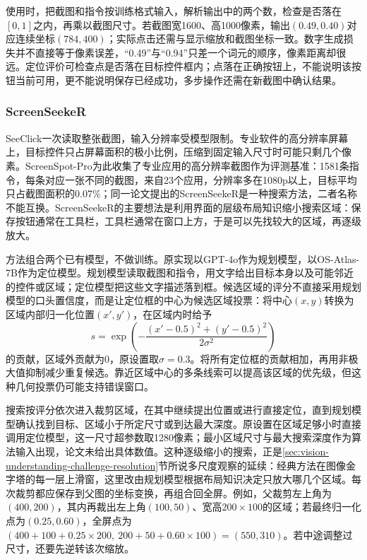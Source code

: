 使用时，把截图和指令按训练格式输入，解析输出中的两个数，检查是否落在$[0,1]$之内，再乘以截图尺寸。若截图宽1600、高1000像素，输出$(0.49,0.40)$对应连续坐标$(784,400)$；实际点击还需与显示缩放和截图坐标一致。数字生成损失并不直接等于像素误差，“0.49”与“0.94”只差一个词元的顺序，像素距离却很远。定位评价可检查点是否落在目标控件框内；点落在正确按钮上，不能说明该按钮当前可用，更不能说明保存已经成功，多步操作还需在新截图中确认结果。

\subsubsection{ScreenSeekeR}
\label{sec:vision-understanding-screenseeker}

SeeClick一次读取整张截图，输入分辨率受模型限制。专业软件的高分辨率屏幕上，目标控件只占屏幕面积的极小比例，压缩到固定输入尺寸时可能只剩几个像素。ScreenSpot-Pro为此收集了专业应用的高分辨率截图作为评测基准：1581条指令，每条对应一张不同的截图，来自23个应用，分辨率多在1080p以上，目标平均只占截图面积的0.07\%；同一论文提出的ScreenSeekeR是一种搜索方法，二者名称不能互换。ScreenSeekeR的主要想法是利用界面的层级布局知识缩小搜索区域：保存按钮通常在工具栏，工具栏通常在窗口上方，于是可以先找较大的区域，再逐级放大。

方法组合两个已有模型，不做训练。原实现以GPT-4o作为规划模型，以OS-Atlas-7B作为定位模型。规划模型读取截图和指令，用文字给出目标本身以及可能邻近的控件或区域；定位模型把这些文字描述落到框。候选区域的评分不直接采用规划模型的口头置信度，而是让定位框的中心为候选区域投票：将中心$(x,y)$转换为区域内部归一化位置$(x',y')$，在区域内时给予
\begin{equation}
  s=\exp\!\left(-\frac{(x'-0.5)^2+(y'-0.5)^2}{2\sigma^2}\right)
  \label{eq:vision-screenseeker-vote}
\end{equation}
的贡献，区域外贡献为0，原设置取$\sigma=0.3$。将所有定位框的贡献相加，再用非极大值抑制减少重复候选。靠近区域中心的多条线索可以提高该区域的优先级，但这种几何投票仍可能支持错误窗口。

搜索按评分依次进入裁剪区域，在其中继续提出位置或进行直接定位，直到规划模型确认找到目标、区域小于所定尺寸或到达最大深度。原设置在区域足够小时直接调用定位模型，这一尺寸超参数取1280像素；最小区域尺寸与最大搜索深度作为算法输入出现，论文未给出具体数值。这种逐级缩小的搜索，正是\ref{sec:vision-understanding-challenge-resolution}节所说多尺度观察的延续：经典方法在图像金字塔的每一层上滑窗，这里改由规划模型根据布局知识决定只放大哪几个区域。每次裁剪都应保存到父图的坐标变换，再组合回全屏。例如，父裁剪左上角为$(400,200)$，其内再裁出左上角$(100,50)$、宽高$200\times100$的区域；若最终归一化点为$(0.25,0.60)$，全屏点为$(400+100+0.25\times200,\ 200+50+0.60\times100)=(550,310)$。若中途调整过尺寸，还要先逆转该次缩放。

